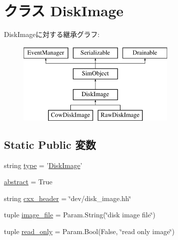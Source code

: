 \hypertarget{classDiskImage_1_1DiskImage}{
\section{クラス DiskImage}
\label{classDiskImage_1_1DiskImage}
}
DiskImageに対する継承グラフ:\begin{figure}[H]
\begin{center}
\leavevmode
\includegraphics[height=4cm]{classDiskImage_1_1DiskImage}
\end{center}
\end{figure}
\subsection*{Static Public 変数}
\begin{DoxyCompactItemize}
\item 
string \hyperlink{classDiskImage_1_1DiskImage_acce15679d830831b0bbe8ebc2a60b2ca}{type} = '\hyperlink{classDiskImage_1_1DiskImage}{DiskImage}'
\item 
\hyperlink{classDiskImage_1_1DiskImage_a17fa61ac3806b481cafee5593b55e5d0}{abstract} = True
\item 
string \hyperlink{classDiskImage_1_1DiskImage_a17da7064bc5c518791f0c891eff05fda}{cxx\_\-header} = \char`\"{}dev/disk\_\-image.hh\char`\"{}
\item 
tuple \hyperlink{classDiskImage_1_1DiskImage_ac12001087117f0553e2d0bad6e2ab2bf}{image\_\-file} = Param.String(\char`\"{}disk image file\char`\"{})
\item 
tuple \hyperlink{classDiskImage_1_1DiskImage_a4a42c250e4afec93e064bf70b6e6ee73}{read\_\-only} = Param.Bool(False, \char`\"{}read only image\char`\"{})
\end{DoxyCompactItemize}


